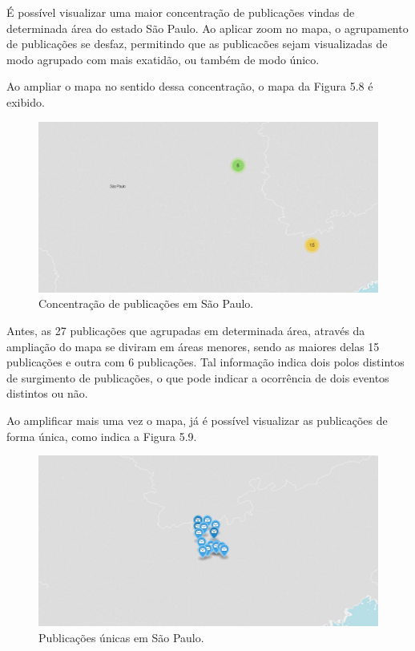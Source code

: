 É possível visualizar uma maior concentração de publicações vindas de determinada área do estado São Paulo. Ao aplicar zoom no mapa, o agrupamento de publicações se desfaz, permitindo que as publicacões sejam visualizadas de modo agrupado com mais exatidão, ou também de modo único. 

Ao ampliar o mapa no sentido dessa concentração, o mapa da Figura 5.8 é exibido.

\begin{figure}[h!]
  \begin{center}
  \includegraphics[width=1.0\textwidth]{figuras/mapa-marcador-2.pdf}
  \caption{Concentração de publicações em São Paulo.}
  \end{center}
\end{figure}

Antes, as 27 publicações que agrupadas em determinada área, através da ampliação do mapa se diviram em áreas menores, sendo as maiores delas 15 publicações e outra com 6 publicações. Tal informação indica dois polos distintos de surgimento de publicações, o que pode indicar a ocorrência de dois eventos distintos ou não.

Ao amplificar mais uma vez o mapa, já é possível visualizar as publicações de forma única, como indica a Figura 5.9.

\begin{figure}[h!]
  \begin{center}
  \includegraphics[width=1.0\textwidth]{figuras/mapa-marcador-3.pdf}
  \caption{Publicações únicas em São Paulo.}
  \end{center}
\end{figure}

